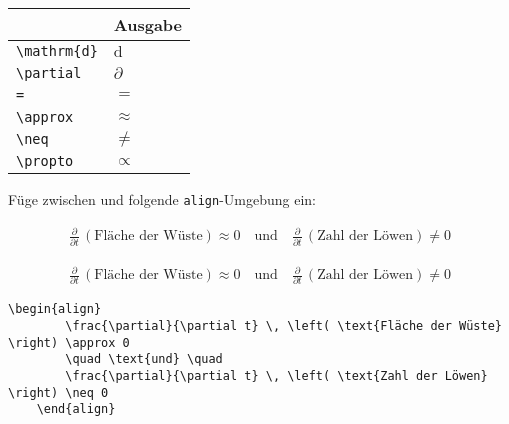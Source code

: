 \documentclass["WS\space 16-17\space -\space LaTeX-Kurs\space -\space Praesentation\space -\space 1.tex"]{subfiles}
\begin{document}
\begin{frame}[fragile]
	\begin{center}
		\begin{tabular}{ll}
			\toprule
			\color{math-cmd}{Mathe}\color{black}{-Befehl}							&	Ausgabe					\\ \midrule
			\lstinline|\mathrm{d}|		&	$\mathrm{d}$		\\
			\lstinline|\partial|		&	$\partial$		
			\\
			\lstinline|=|		&	$=$		
      \\
			\lstinline|\approx|		&	$\approx$		
			\\
			\lstinline|\neq|					&	$\neq$		\\
	        \lstinline|\propto|					&	$\propto$		\\
			\bottomrule
		\end{tabular}
	\end{center}
	\pause\btVFill
	\Aufgabee
		Füge zwischen  und  folgende \lstinline[basicstyle=\normalfont\normalsize]|align|-Umgebung ein:
	\begin{outputbox}
	    \begin{align}
		    \frac{\partial}{\partial t} \, \left( \text{Fläche der Wüste} \right) \approx 0
		    \quad \text{und} \quad
		      \frac{\partial}{\partial t} \, \left( \text{Zahl der Löwen} \right) \neq 0
		\end{align}	
    \end{outputbox}
	\vspace{0.3cm}
\end{frame}
\begin{frame}[fragile]
	\Losung
	\begin{outputbox}
	    \begin{align}
	        \frac{\partial}{\partial t} \, \left( \text{Fläche der Wüste} \right) \approx 0
	        \quad \text{und} \quad
	        \frac{\partial}{\partial t} \, \left( \text{Zahl der Löwen} \right) \neq 0
	    \end{align}
	\end{outputbox}

	\Code
	\begin{lstlisting}[gobble=4]
    \begin{align}
        \frac{\partial}{\partial t} \, \left( \text{Fläche der Wüste} \right) \approx 0
        \quad \text{und} \quad
        \frac{\partial}{\partial t} \, \left( \text{Zahl der Löwen} \right) \neq 0
    \end{align}
	\end{lstlisting}
\end{frame}
\end{document}
